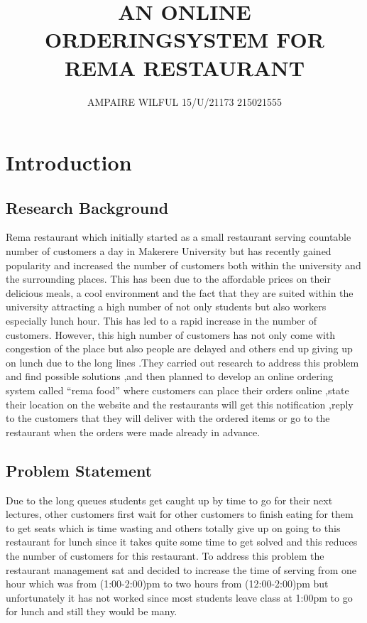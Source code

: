 \documentclass {article}
\begin{document}
\title{AN ONLINE ORDERINGSYSTEM FOR REMA RESTAURANT}
\author {AMPAIRE WILFUL 15/U/21173   215021555}
\maketitle

\section {Introduction}

\subsection{ Research Background }
 Rema restaurant which initially started as a small restaurant serving countable number of customers a day in Makerere University but has recently gained popularity and increased the number of customers both within the university and the surrounding places. This has been due to the affordable prices on their delicious meals, a cool environment and the fact that they are suited within the university attracting a high number of not only students but also workers especially lunch hour. This has led to a rapid increase in the number of customers. However, this high number of customers has not only come with congestion of the place but also people are delayed and others end up giving up on lunch due to the long lines .They carried out research to address this problem and find possible solutions ,and then planned to develop an online ordering system called “rema food” where customers can place their orders online ,state their location on the website and the restaurants will get this notification ,reply to the customers that they will deliver with the ordered items or go to the restaurant when the orders were made already in advance.

\subsection { Problem Statement }
Due to the long queues students get caught up by time to go for their next lectures, other customers first wait for other customers to finish eating for them to get seats which is time wasting and others totally give up on going to this restaurant for lunch since it takes quite some time to get solved and this reduces the number of customers for this restaurant.   To address this problem the restaurant management sat and decided to increase the time of serving from one hour which was from (1:00-2:00)pm to two hours from (12:00-2:00)pm but unfortunately it has not worked since most students leave class at 1:00pm to go for lunch and still they would be many.
\end{document}
